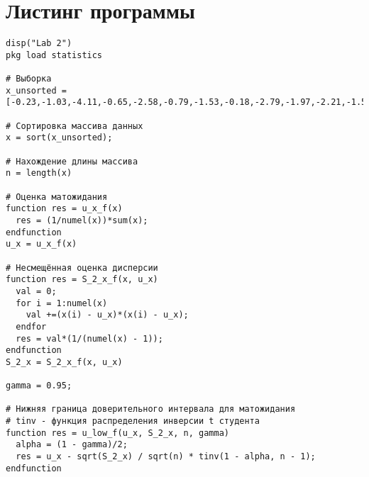 \begin{figure}[H]
	\center{\texttt{[image: 1]}}
\end{figure}

\begin{figure}[H]
	\center{\texttt{[image: 2]}}
\end{figure}

\begin{figure}[H]
	\center{\texttt{[image: 3]}}
\end{figure}

\newpage

\section{Листинг программы}
\begin{lstlisting}
disp("Lab 2")
pkg load statistics

# Выборка
x_unsorted = [-0.23,-1.03,-4.11,-0.65,-2.58,-0.79,-1.53,-0.18,-2.79,-1.97,-2.21,-1.59,-0.22,-3.18,-1.18,-1.42,-1.29,-2.22,-0.82,-1.87,-2.30,-0.94,-0.74,-2.45,-1.40,-2.09,-0.68,0.02,-1.80,-2.25,-1.19,-2.17,-1.89,-1.14,-1.50,-1.76,-0.69,-2.21,-1.65,-1.51,-2.11,-2.24,-0.72,0.94,-0.67,-2.44,-2.27,-1.33,-3.03,-0.42,-2.86,-2.00,-1.37,-1.90,-2.80,-0.89,-2.04,-1.66,-0.14,-2.79,-0.21,-1.29,-2.81,-0.29,-1.55,-0.45,-1.16,-3.96,-3.77,-3.36,-1.81,0.13,-2.61,-3.69,-3.00,-2.61,-0.74,-0.41,-0.78,-1.49,-1.89,-1.24,-0.00,-2.72,-1.69,-1.25,-1.59,0.20,-1.08,-2.42,-3.14,-2.54,-2.09,-2.51,-2.65,-2.42,-1.30,-0.65,1.40,-2.33,-1.97,-0.54,-1.13,-2.04,0.77,-1.03,-1.55,-1.47,-0.09,-2.11,-2.08,-1.79,-1.36,-1.92,-3.04,-1.08,-1.67,-2.11,-1.99,-1.64];

# Сортировка массива данных
x = sort(x_unsorted);

# Нахождение длины массива
n = length(x)

# Оценка матожидания
function res = u_x_f(x)
  res = (1/numel(x))*sum(x);
endfunction
u_x = u_x_f(x)

# Несмещённая оценка дисперсии
function res = S_2_x_f(x, u_x)
  val = 0;
  for i = 1:numel(x)
    val +=(x(i) - u_x)*(x(i) - u_x);
  endfor
  res = val*(1/(numel(x) - 1));
endfunction
S_2_x = S_2_x_f(x, u_x)

gamma = 0.95;

# Нижняя граница доверительного интервала для матожидания
# tinv - функция распределения инверсии t студента
function res = u_low_f(u_x, S_2_x, n, gamma)
  alpha = (1 - gamma)/2;
  res = u_x - sqrt(S_2_x) / sqrt(n) * tinv(1 - alpha, n - 1);
endfunction


\end{lstlisting}
